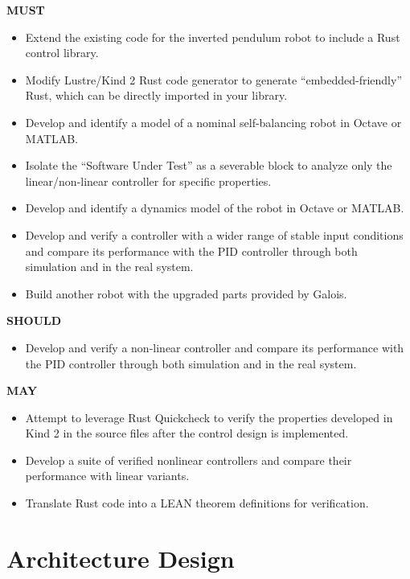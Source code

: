 \documentclass[a4paper,12pt]{article}
\begin{document}
\textbf{MUST}
\begin{itemize}
    \item Extend the existing code for the inverted pendulum robot to include a Rust control library.
    \item Modify Lustre/Kind 2 Rust code generator to generate “embedded-friendly” Rust, which can be directly imported in your library.
    \item Develop and identify a model of a nominal self-balancing robot in Octave or MATLAB.
    \item Isolate the “Software Under Test” as a severable block to analyze only the linear/non-linear controller for specific properties.
    \item Develop and identify a dynamics model of the robot in Octave or MATLAB.
    \item Develop and verify a controller with a wider range of stable input conditions and compare its performance with the PID controller through both simulation and in the real system.
    \item Build another robot with the upgraded parts provided by Galois.
\end{itemize}
\textbf{SHOULD}
\begin{itemize}
    \item Develop and verify a non-linear controller and compare its performance with the PID controller through both simulation and in the real system.
\end{itemize}
\textbf{MAY}
\begin{itemize}
    \item Attempt to leverage Rust Quickcheck to verify the properties developed in Kind 2 in the source files after the control design is implemented.
    \item Develop a suite of verified nonlinear controllers and compare their performance with linear variants.
    \item Translate Rust code into a LEAN theorem definitions for verification.
\end{itemize}

\section{Architecture Design}
\end{document}

